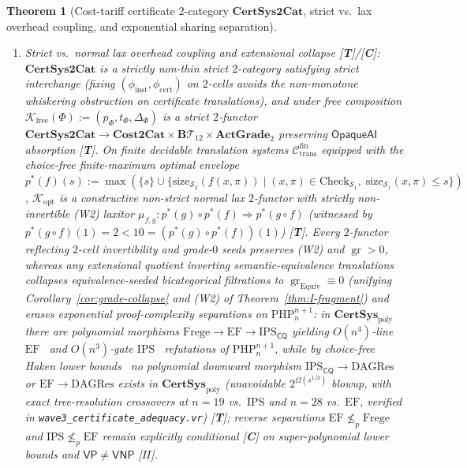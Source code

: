 \documentclass[11pt]{article}
\theoremstyle{plain}
\newtheorem{theorem}{Theorem}[section]
\theoremstyle{definition}
\newcommand{\gr}{\operatorname{gr}}
\begin{document}
\begin{theorem}[Cost-tariff certificate $2$-category $\mathbf{CertSys2Cat}$, strict vs.\ lax overhead coupling, and exponential sharing separation]
\begin{enumerate}[nosep,label=(\roman*)]
\item \emph{Strict vs.\ normal lax overhead coupling and extensional collapse \textup{[\textbf{T}]}/\textup{[\textbf{C}]}}: $\mathbf{CertSys2Cat}$ is a strictly non-thin strict $2$-category satisfying strict interchange (fixing $(\phi_{\mathrm{inst}}, \phi_{\mathrm{cert}})$ on $2$-cells avoids the non-monotone whiskering obstruction on certificate translations), and under free composition $\mathcal{K}_{\mathrm{free}}(\Phi) := (p_\Phi, t_\Phi, \Delta_\Phi)$ is a \emph{strict} $2$-functor $\mathbf{CertSys2Cat} \to \mathbf{Cost2Cat} \times \mathbf{B}\mathcal{T}_{12} \times \mathbf{ActGrade}_2$ preserving $\mathsf{OpaqueAI}$ absorption \textup{[\textbf{T}]}. On finite decidable translation systems $\mathcal{C}_{\mathrm{trans}}^{\mathrm{fin}}$ equipped with the choice-free finite-maximum optimal envelope $p^*(f)(s) := \max(\{s\} \cup \{\mathrm{size}_{\mathcal{S}_2}(f(x,\pi)) \mid (x,\pi) \in \mathrm{Check}_{\mathcal{S}_1},\; \mathrm{size}_{\mathcal{S}_1}(x,\pi) \le s\})$, $\mathcal{K}_{\mathrm{opt}}$ is a constructive \emph{non-strict normal lax} $2$-functor with strictly non-invertible \textup{(W2)} laxitor $\mu_{f,g} : p^*(g)\circ p^*(f) \Rightarrow p^*(g\circ f)$ (witnessed by $p^*(g\circ f)(1) = 2 < 10 = (p^*(g)\circ p^*(f))(1)$) \textup{[\textbf{T}]}. Every $2$-functor reflecting $2$-cell invertibility and grade-$0$ seeds preserves \textup{(W2)} and $\gr > 0$, whereas any extensional quotient inverting semantic-equivalence translations collapses equivalence-seeded bicategorical filtrations to $\gr_{\mathrm{Equiv}} \equiv 0$ (unifying Corollary~\ref{cor:grade-collapse} and \textup{(W2)} of Theorem~\ref{thm:I-fragment}) and erases exponential proof-complexity separations on $\mathrm{PHP}_n^{n+1}$: in $\mathbf{CertSys}_{\mathrm{poly}}$ there are polynomial morphisms $\mathrm{Frege} \to \mathrm{EF} \to \mathrm{IPS}_{\mathsf{CQ}}$ yielding $O(n^4)$-line $\mathrm{EF}$~\cite{CookReckhow1979} and $O(n^3)$-gate $\mathrm{IPS}$~\cite{GrochowPitassi2018} refutations of $\mathrm{PHP}_n^{n+1}$, while by choice-free Haken lower bounds~\cite{Haken1985} \emph{no} polynomial downward morphism $\mathrm{IPS}_{\mathsf{CQ}} \to \mathrm{DAGRes}$ or $\mathrm{EF} \to \mathrm{DAGRes}$ exists in $\mathbf{CertSys}_{\mathrm{poly}}$ (unavoidable $2^{\Omega(s^{1/3})}$ blowup, with exact tree-resolution crossovers at $n = 19$ vs.\ $\mathrm{IPS}$ and $n = 28$ vs.\ $\mathrm{EF}$, verified in \texttt{wave3\_certificate\_adequacy.vr}) \textup{[\textbf{T}]}; reverse separations $\mathrm{EF} \not\le_p \mathrm{Frege}$ and $\mathrm{IPS} \not\le_p \mathrm{EF}$ remain explicitly conditional \textup{[\textbf{C}]} on super-polynomial lower bounds and $\mathsf{VP} \neq \mathsf{VNP}$ \textup{[\textbf{$\Pi$}]}.

\end{enumerate}
\end{theorem}
\end{document}
